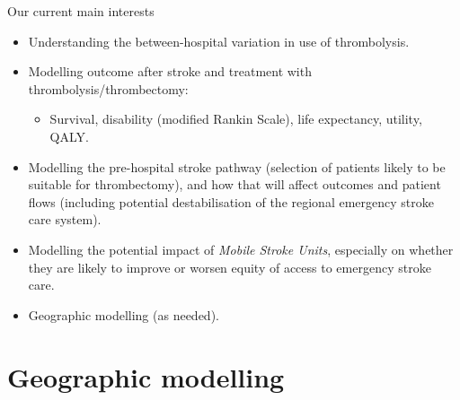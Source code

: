 \documentclass{beamer}
\begin{document}
\begin{frame}{Our current main interests}

\begin{itemize}
\setlength{\itemsep}{2mm}
    \item Understanding the between-hospital variation in use of thrombolysis.
    \item Modelling outcome after stroke and treatment with thrombolysis/thrombectomy:
        \begin{itemize}
            \item Survival, disability (modified Rankin Scale), life expectancy, utility, QALY.
        \end{itemize}
    \item Modelling the pre-hospital stroke pathway (selection of patients likely to be suitable for thrombectomy), and how that will affect outcomes and patient flows (including potential destabilisation of the regional emergency stroke care system).
    \item Modelling the potential impact of \emph{Mobile Stroke Units}, especially on whether they are likely to improve or worsen equity of access to emergency stroke care.
    \item Geographic modelling (as needed).
\end{itemize}
\end{frame}


\section{Geographic modelling}
\end{document}
